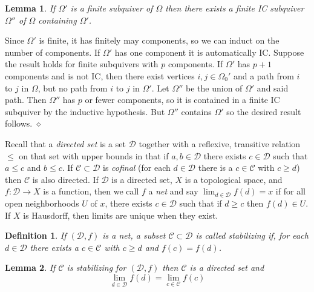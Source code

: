 \documentclass{article}
\newtheorem{lemma}{Lemma}[section]
\newtheorem{definition}{Definition}
\newenvironment{proof}{\vspace*{2ex}\noindent {\em Proof:}
}{\hfill $\diamond$ \\[2ex]}
\begin{document}
\begin{lemma}\label{lem: finite subquivers are contained in finite IC subquivers}
If $\Omega'$ is a finite subquiver of $\Omega$ then there exists a finite IC subquiver $\Omega''$ of $\Omega$ containing $\Omega'$. 
\end{lemma}

\begin{proof}
Since $\Omega'$ is finite, it has finitely may components, so we can induct on the number of components. If $\Omega'$ has one component it is automatically IC. Suppose the result holds for finite subquivers with $p$ components. If $\Omega'$ has $p + 1$ components and is not IC, then there exist vertices $i, j \in \Omega_0'$ and a path from $i$ to $j$ in $\Omega$, but no path from $i$ to $j$ in $\Omega'$. Let $\Omega''$ be the union of $\Omega'$ and said path. Then $\Omega''$ has  $p$ or fewer components, so it is contained in a finite IC subquiver by the inductive hypothesis. But $\Omega''$ contains $\Omega'$ so the desired result follows. 
\end{proof}

Recall that a \emph{directed set} is a set $\mathcal{D}$ together with a reflexive, transitive relation $\leq$ on that set with upper bounds in that if  $a , b \in \mathcal{D}$ there exists $c \in \mathcal{D}$ such that $a \leq c$ and $b \leq c$.  If $\mathcal{C} \subset \mathcal{D}$ is \emph{cofinal} (for each $d \in \mathcal{D}$ there is a $c \in \mathcal{C}$ with $c \geq d$) then $\mathcal{C}$ is also directed.   If $\mathcal{D}$ is a directed set, $X$ is a topological space, and $f : \mathcal{D} \to X$ is a function, then we call $f$ a \emph{net} and  say $\lim_{d \in \mathcal{D}} f(d) = x$ if for all open neighborhoods $U$ of $x$, there exists $c \in \mathcal{D}$ such that if $d \geq c$ then $f(d) \in U$.   If $X$ is Hausdorff, then limits are unique when they exist. 

\begin{definition}
  If $(\mathcal{D},f)$ is a net, a subset $\mathcal{C} \subset \mathcal{D}$ is called \emph{stabilizing} if, for each $d \in \mathcal{D}$ there exists a $c \in \mathcal{C}$ with $c \geq d$ and $f(c)=f(d)$.  
\end{definition}

\begin{lemma} \label{lem: stabilizing preserves limits}
  If $\mathcal{C}$ is stabilizing for  $(\mathcal{D},f)$ then $\mathcal{C}$ is a directed set  and
  \[\lim_{d \in \mathcal{D}} f(d) = \lim_{c \in \mathcal{C}} f(c)\]
\end{lemma}
\end{document}
